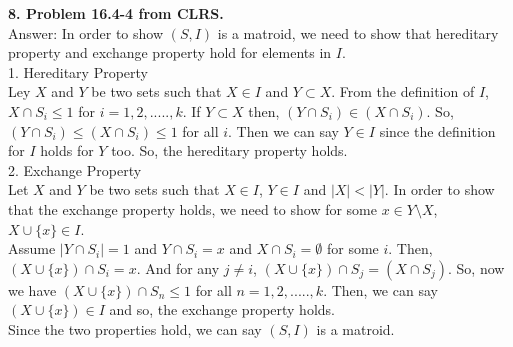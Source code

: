 \documentclass{article}
\begin{document}
\noindent
\textbf{8. Problem 16.4-4 from CLRS.} \\ \newline
Answer: In order to show $(S,I)$ is a matroid, we need to show that hereditary property and exchange property hold for elements in $I$. \\
1. Hereditary Property \\ 
Ley $X$ and $Y$ be two sets such that $X \in I$ and $Y \subset X$. From the definition of $I$, $X \cap S_i \leq 1$ for $i = 1, 2, ....., k$. If $Y \subset X$ then, $(Y \cap S_i) \in (X \cap S_i)$. So, $(Y \cap S_i) \leq (X \cap S_i) \leq 1$ for all $i$. Then we can say $Y \in I$ since the definition for $I$ holds for $Y$ too. So, the hereditary property holds. \\
2. Exchange Property \\
Let $X$ and $Y$ be two sets such that $X \in I$, $Y \in I$ and $|X| < |Y|$. In order to show that the exchange property holds, we need to show for some $x \in Y \setminus X$, $X \cup \{x\} \in I$.\\
 Assume $|Y \cap S_i| = 1$ and $Y \cap S_i = x$ and $X \cap S_i = \emptyset$ for some $i$. Then, $(X \cup \{x\}) \cap S_i = x$. And for any $j \neq i$, $(X \cup \{x\}) \cap S_j = (X \cap S_j)$. So, now we have $(X \cup \{x\}) \cap S_n \leq 1$ for all $n = 1, 2, ....., k$. Then, we can say  $(X \cup \{x\}) \in I$ and so, the exchange property holds.\\
Since the two properties hold, we can say $(S, I)$ is a matroid.
\noindent
\textbf{}
\end{document}
